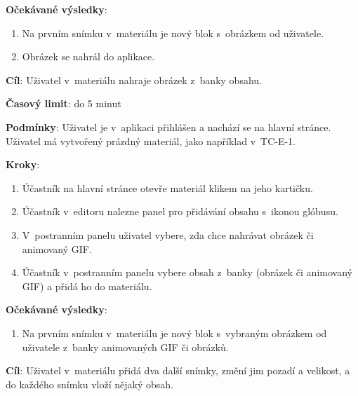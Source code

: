 \textbf{Očekávané výsledky}:

\begin{enumerate}[leftmargin=1.4cm]
    \item Na prvním snímku v~materiálu je nový blok s~obrázkem od uživatele.
    \item Obrázek se nahrál do aplikace.
\end{enumerate}






\vspace{1em}

\textbf{Cíl}: Uživatel v~materiálu nahraje obrázek z~banky obsahu.

\textbf{Časový limit}: do 5 minut

\textbf{Podmínky}:  Uživatel je v~aplikaci přihlášen a nachází se na hlavní stránce. Uživatel má vytvořený prázdný materiál, jako například v~TC-E-1.

\textbf{Kroky}:

\begin{enumerate}[leftmargin=1.4cm]
    \item Účastník na hlavní stránce otevře materiál klikem na jeho kartičku.
    \item Účastník v~editoru nalezne panel pro přidávání obsahu s~ikonou glóbusu.
    \item V~postranním panelu uživatel vybere, zda chce nahrávat obrázek či animovaný GIF.
    \item Účastník v~postranním panelu vybere obsah z~banky (obrázek či animovaný GIF) a přidá ho do materiálu.
\end{enumerate}

\textbf{Očekávané výsledky}:

\begin{enumerate}[leftmargin=1.4cm]
    \item Na prvním snímku v~materiálu je nový blok s~vybraným obrázkem od uživatele z~banky animovaných GIF či obrázků.
\end{enumerate}






\vspace{1em}

\textbf{Cíl}: Uživatel v~materiálu přidá dva další snímky, změní jim pozadí a velikost, a do každého snímku vloží nějaký obsah.

